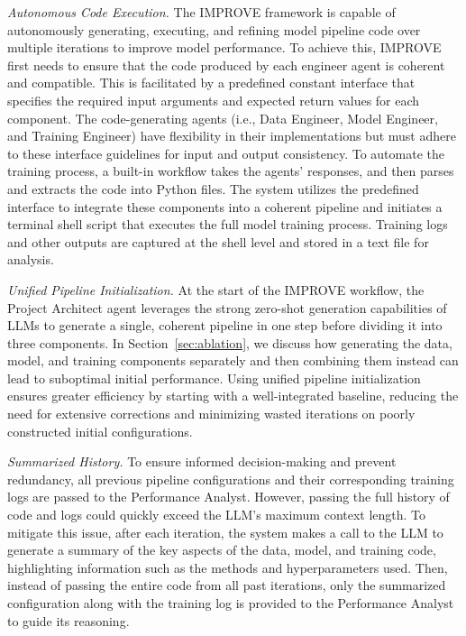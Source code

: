 \textit{Autonomous Code Execution.}
The IMPROVE framework is capable of autonomously generating, executing, and refining model pipeline code over multiple iterations to improve model performance. To achieve this, IMPROVE first needs to ensure that the code produced by each engineer agent is coherent and compatible. This is facilitated by a predefined constant interface that specifies the required input arguments and expected return values for each component. The code-generating agents (i.e., Data Engineer, Model Engineer, and Training Engineer) have flexibility in their implementations but must adhere to these interface guidelines for input and output consistency. To automate the training process, a built-in workflow takes the agents' responses, and then parses and extracts the code into Python files. The system utilizes the predefined interface to integrate these components into a coherent pipeline and initiates a terminal shell script that executes the full model training process. Training logs and other outputs are captured at the shell level and stored in a text file for analysis.

\textit{Unified Pipeline Initialization.}
At the start of the IMPROVE workflow, the Project Architect agent leverages the strong zero-shot generation capabilities of LLMs to generate a single, coherent pipeline in one step before dividing it into three components. In Section~\ref{sec:ablation}, we discuss how generating the data, model, and training components separately and then combining them instead can lead to suboptimal initial performance. Using unified pipeline initialization ensures greater efficiency by starting with a well-integrated baseline, reducing the need for extensive corrections and minimizing wasted iterations on poorly constructed initial configurations.

\textit{Summarized History.}
To ensure informed decision-making and prevent redundancy, all previous pipeline configurations and their corresponding training logs are passed to the Performance Analyst. However, passing the full history of code and logs could quickly exceed the LLM’s maximum context length. To mitigate this issue, after each iteration, the system makes a call to the LLM to generate a summary of the key aspects of the data, model, and training code, highlighting information such as the methods and hyperparameters used. Then, instead of passing the entire code from all past iterations, only the summarized configuration along with the training log is provided to the Performance Analyst to guide its reasoning.